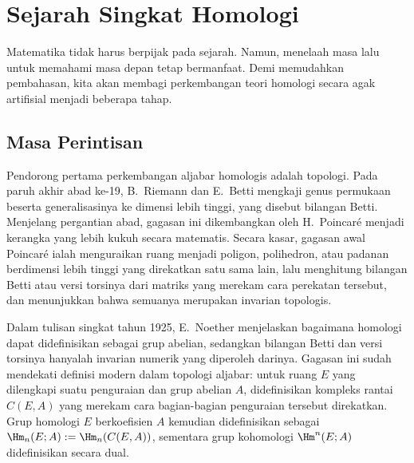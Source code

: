 
\section*{Sejarah Singkat Homologi}
\hypertarget{o014.aljabr2.prelude.homology-history}{ }

Matematika tidak harus berpijak pada sejarah. Namun, menelaah masa lalu
untuk memahami masa depan tetap bermanfaat. Demi memudahkan pembahasan,
kita akan membagi perkembangan teori homologi secara agak artifisial
menjadi beberapa tahap.

\subsection*{Masa Perintisan}

Pendorong pertama perkembangan aljabar homologis adalah topologi. Pada
paruh akhir abad ke-19, B.\ Riemann dan E.\ Betti mengkaji genus permukaan
beserta generalisasinya ke dimensi lebih tinggi, yang disebut bilangan
Betti. Menjelang pergantian abad, gagasan ini dikembangkan oleh
H.\ Poincaré menjadi kerangka yang lebih kukuh secara matematis. Secara kasar, gagasan
awal Poincaré ialah menguraikan ruang menjadi poligon, polihedron, atau
padanan berdimensi lebih tinggi yang direkatkan satu sama lain, lalu
menghitung bilangan Betti atau versi torsinya dari matriks yang merekam
cara perekatan tersebut, dan menunjukkan bahwa semuanya merupakan
invarian topologis.

Dalam tulisan singkat tahun 1925, E.\ Noether menjelaskan
bagaimana homologi dapat didefinisikan sebagai grup abelian, sedangkan
bilangan Betti dan versi torsinya hanyalah invarian numerik yang diperoleh
darinya. Gagasan ini sudah mendekati definisi modern dalam topologi
aljabar: untuk ruang $E$ yang dilengkapi suatu penguraian dan grup
abelian $A$, didefinisikan
kompleks rantai $C(E, A)$ yang merekam cara bagian-bagian penguraian
tersebut direkatkan.
Grup homologi $E$ berkoefisien $A$ kemudian didefinisikan sebagai
$\Hm_n(E; A) := \Hm_n(C(E, A))$, sementara grup kohomologi
$\Hm^n(E; A)$ didefinisikan secara dual.


